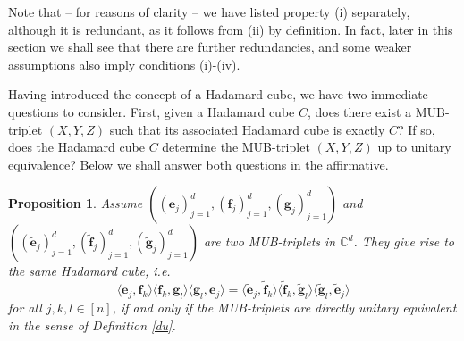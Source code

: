 \documentclass[12pt]{amsart}
\numberwithin{equation}{section}
\newcommand{\C}{\mathbb{C}}
\newtheorem{proposition}[fact]{Proposition}
\theoremstyle{definition}
\theoremstyle{remark}
\theoremstyle{remark}
\def \C {\mathbb{C}}
\newcommand{\gb}{\ensuremath{\mathbf{g}}}
\newcommand{\eb}{\ensuremath{\mathbf{e}}}
\newcommand{\fb}{\ensuremath{\mathbf{f}}}
\begin{document}
Note that -- for reasons of clarity -- we have listed property (i) separately, although it is redundant, as it follows from (ii) by definition. In fact, later in this section we shall see that there are further redundancies, and some weaker assumptions also imply conditions (i)-(iv). 

\medskip

Having introduced the concept of a Hadamard cube, we have two immediate questions to consider. First, given a Hadamard cube $C$, does there exist a MUB-triplet $(X, Y, Z)$ such that its associated Hadamard cube is exactly $C$? If so, does the Hadamard cube $C$ determine the  MUB-triplet $(X, Y, Z)$ up to unitary equivalence? Below we shall answer both questions in the affirmative. 


\begin{proposition}
\label{prop:triplet_equiv}
Assume
$((\eb_j)_{j=1}^d,(\fb_j)_{j=1}^d,(\gb_j)_{j=1}^d)$ and
$((\tilde{\eb}_j)_{j=1}^d,(\tilde{\fb}_j)_{j=1}^d,(\tilde{\gb}_j)_{j=1}^d)$
are two MUB-triplets in $\C^d$. They
give rise to the same Hadamard cube, i.e. 
$$
\langle \eb_j, \fb_k\rangle 
\langle \fb_k, \gb_l\rangle
\langle \gb_l, \eb_j\rangle 
= 
\langle \tilde{\eb}_j, \tilde{\fb}_k\rangle 
\langle \tilde{\fb}_k, \tilde{\gb}_l\rangle
\langle \tilde{\gb}_l, \tilde{\eb}_j\rangle 
$$
for all $j,k,l\in [n]$, if and only if the MUB-triplets  are directly unitary equivalent in the sense of Definition \ref{du}.
\end{proposition}
\end{document}
